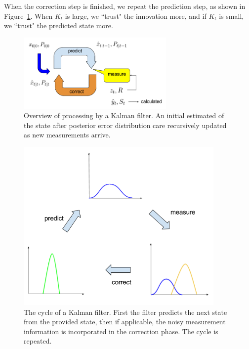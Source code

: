 When the correction step is finished, we repeat the prediction step, as shown in Figure~\ref{fig:kalmanprocess}. When $K_t$ is large, we \textquotedblleft trust" the innovation more, and if $K_t$ is small, we \textquotedblleft trust" the predicted state more.

\begin{figure}[t]
	\centering
	\includegraphics[width=3in]{figures/kalmanprocess.jpg}  
	\caption[kalman]{Overview of processing by a Kalman filter. An initial estimated of the state after posterior error distribution care recursively updated as new measurements arrive. }
	\label{fig:kalmanprocess}
\end{figure}

\begin{figure}[t]
	\centering
	\includegraphics[width=4in]{figures/kalman.jpg}  
	\caption[kalman]{The cycle of a Kalman filter. First the filter predicts the next state from the provided state, then if applicable, the noisy measurement information is incorporated in the correction phase. The cycle is repeated. }
	\label{fig:kalman}
\end{figure}


\FloatBarrier

